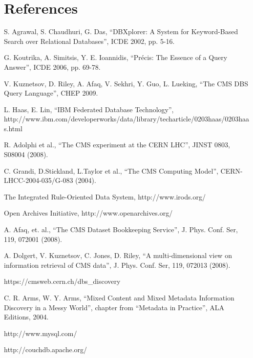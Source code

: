 \documentclass[1p,times]{elsarticle}
\begin{document}
\section*{References}
\begin{thebibliography}{00}
S. Agrawal, S. Chaudhuri, G. Das,
``DBXplorer: A System for Keyword-Based Search over Relational Databases'',
ICDE 2002, pp. 5-16.

G. Koutrika, A. Simitsis, Y. E. Ioannidis,
``Pr\'{e}cis: The Essence of a Query Answer'',
ICDE 2006, pp. 69-78.

V. Kuznetsov, D. Riley, A. Afaq, V. Sekhri, Y. Guo, L. Lueking,
``The CMS DBS Query Language'', CHEP 2009.


L. Haas, E. Lin,
``IBM Federated Database Technology'', \\
http://www.ibm.com/developerworks/data/library/techarticle/0203haas/0203haas.html

R. Adolphi et al., 
``The CMS experiment at the CERN LHC'',
JINST 0803, S08004 (2008).

C. Grandi, D.Stickland, L.Taylor et al.,
``The CMS Computing Model'',
CERN-LHCC-2004-035/G-083 (2004).

The Integrated Rule-Oriented Data System,
http://www.irods.org/

Open Archives Initiative,
http://www.openarchives.org/

A. Afaq, et. al.,
``The CMS Dataset Bookkeeping Service'', 
J. Phys. Conf. Ser, 119, 072001 (2008).

A. Dolgert, V. Kuznetsov, C. Jones, D. Riley, 
``A multi-dimensional view on information retrieval of CMS data'',
J. Phys. Conf. Ser, 119, 072013 (2008).

 https://cmsweb.cern.ch/dbs\_discovery

C. R. Arms, W. Y. Arms,
 ``Mixed Content and Mixed Metadata 
Information Discovery in a Messy World'',
chapter from ``Metadata in Practice'', ALA Editions, 2004.

http://www.mysql.com/

http://couchdb.apache.org/


\end{thebibliography}
\end{document}
